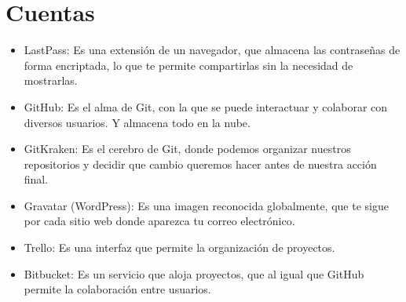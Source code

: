 \documentclass[12pt,letterpaper]{article}
\begin{document}
\section*{Cuentas}
\begin{itemize}
\item LastPass: Es una extensión de un navegador, que almacena las contraseñas de forma encriptada,
lo que te permite compartirlas sin la necesidad de mostrarlas.
\item GitHub: Es el alma de Git, con la que se puede interactuar y colaborar con diversos usuarios.
Y almacena todo en la nube.
\item GitKraken: Es el cerebro de Git, donde podemos organizar nuestros repositorios y decidir que
cambio queremos hacer antes de nuestra acción final.
\item Gravatar (WordPress): Es una imagen reconocida globalmente, que te sigue por cada sitio web
donde aparezca tu correo electrónico.
\item Trello: Es una interfaz que permite la organización de proyectos.
\item Bitbucket: Es un servicio que aloja proyectos, que al igual que GitHub permite la colaboración
entre usuarios.
\end{itemize}

 

\end{document}
